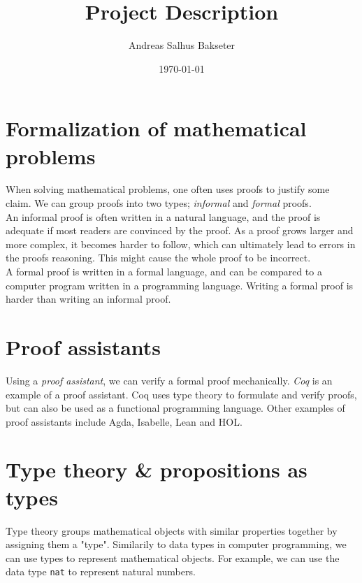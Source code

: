 \documentclass[a4paper,12pt]{article}
\title{\textbf{Project Description}}
\author{Andreas Salhus Bakseter}
\date{\today}
\begin{document}
\maketitle

\section{Formalization of mathematical problems}

When solving mathematical problems, one often uses proofs
to justify some claim. We can group proofs into two types; \textit{informal} and \textit{formal} proofs.
\\

An informal proof is often written in a natural language, and the proof is adequate if most
readers are convinced by the proof.
\supercite{bpierce}
As a proof grows larger and more complex, it becomes harder to follow, which can
ultimately lead to errors in the proofs reasoning. This might cause the whole proof
to be incorrect.
\supercite{rkhamsi}
\\

A formal proof is written in a formal language, and can be compared to a computer program
written in a programming language. Writing a formal proof is harder than writing an informal proof.


\section{Proof assistants}

Using a \textit{proof assistant}, we can verify a formal proof mechanically.
\textit{Coq} is an example of a proof assistant. 
Coq uses type theory to formulate and verify proofs, but can also be used as a functional programming language. \supercite{cintro}
Other examples of proof assistants include Agda, Isabelle, Lean and HOL.

\newpage

\section{Type theory \& propositions as types}

Type theory groups mathematical objects with similar properties together by assigning them a "type".
Similarily to data types in computer programming, we can use types to represent mathematical
objects. For example, we can use the data type \texttt{nat} to represent natural numbers.
\\
\end{document}
